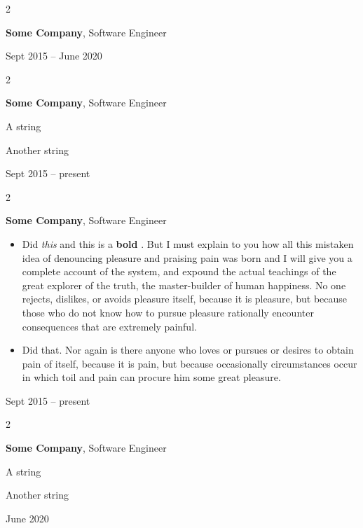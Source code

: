 \documentclass[10pt, letterpaper]{article}
\newenvironment{summary}{
    \begin{description}[
        topsep=0.10 cm,
        parsep=0.10 cm,
        partopsep=0pt,
        itemsep=0pt,
        leftmargin=0.4 cm + 10pt
    ]
}{
    \end{description}
} %
\newenvironment{highlights}{
    \begin{itemize}[
        topsep=0.10 cm,
        parsep=0.10 cm,
        partopsep=0pt,
        itemsep=0pt,
        leftmargin=0.4 cm + 10pt
    ]
}{
    \end{itemize}
} %
\newenvironment{twocolentry}[2][]{
    \onecolentry
    \def\secondColumn{#2}
    \setcolumnwidth{\fill, 4.5 cm}
    \begin{paracol}{2}
}{
    \switchcolumn \raggedleft \secondColumn
    \end{paracol}
    \endonecolentry
} %
\let\hrefWithoutArrow\href
\renewcommand{\href}[2]{\hrefWithoutArrow{#1}{\ifthenelse{\equal{#2}{}}{ }{#2 }\raisebox{.15ex}{\footnotesize \faExternalLink*}}}
\begin{document}
        \vspace{0.2 cm}

        \begin{twocolentry}{
            Sept 2015 – June 2020
        }
            \textbf{Some \textnormal{Company}}, Software Engineer
        \end{twocolentry}


        \vspace{0.2 cm}

        \begin{twocolentry}{
            Sept 2015 – present
        }
            \textbf{Some \textnormal{Company}}, Software Engineer
            \begin{summary}
                \item A string
                \item Another string
            \end{summary}
        \end{twocolentry}


        \vspace{0.2 cm}

        \begin{twocolentry}{
            Sept 2015 – present
        }
            \textbf{Some \textnormal{Company}}, Software Engineer
            \begin{highlights}
                \item Did \textit{this} and this is a \textbf{bold} \href{https://example.com}{link}. But I must explain to you how all this mistaken idea of denouncing pleasure and praising pain was born and I will give you a complete account of the system, and expound the actual teachings of the great explorer of the truth, the master-builder of human happiness. No one rejects, dislikes, or avoids pleasure itself, because it is pleasure, but because those who do not know how to pursue pleasure rationally encounter consequences that are extremely painful.
                \item Did that. Nor again is there anyone who loves or pursues or desires to obtain pain of itself, because it is pain, but because occasionally circumstances occur in which toil and pain can procure him some great pleasure.
            \end{highlights}
        \end{twocolentry}


        \vspace{0.2 cm}

        \begin{twocolentry}{
            June 2020
        }
            \textbf{Some \textnormal{Company}}, Software Engineer
            \begin{summary}
                \item A string
                \item Another string
            \end{summary}
        \end{twocolentry}
\end{document}

